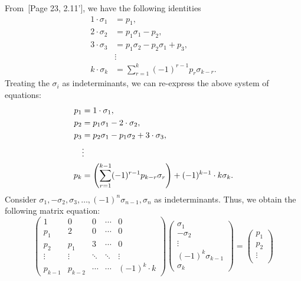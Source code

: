 \documentclass[letterpaper, 11pt, oneside]{book}
\begin{document}
\begin{sol}
  From~[Page 23, 2.11']\cite{book:MacdonaldSymmetricHall}, we have the following identities
  \begin{align*}
    1 \cdot \sigma_{1} &= p_{1}, \\
    2 \cdot \sigma_{2} &= p_{1} \sigma_{1} - p_{2}, \\
    3 \cdot \sigma_{3} &= p_{1} \sigma_{2} - p_{2} \sigma_{1} + p_{3}, \\
                       &\vdots \\
    k \cdot \sigma_{k} &= \sum_{r = 1}^{k} (-1)^{r - 1} p_{r} \sigma_{k - r}.
  \end{align*}
Treating the $\sigma_{i}$ as indeterminants, we can re-express the above system of equations:
\begin{align*}
  p_{1} &= 1 \cdot \sigma_{1}, \\
  p_{2} &= p_{1} \sigma_{1} - 2 \cdot \sigma_{2}, \\
  p_{3} &= p_{2} \sigma_{1} - p_{1} \sigma_{2} + 3 \cdot \sigma_{3}, \\
        &\vdots \\
  p_{k} &= \pqty{\sum_{r = 1}^{k - 1} (-1)^{r - 1} p_{k - r} \sigma_{r}} + (-1)^{k - 1} \cdot k \sigma_{k}.
\end{align*}
Consider $\sigma_{1}, -\sigma_{2}, \sigma_{3}, \ldots, (-1)^{n} \sigma_{n - 1}, \sigma_{n}$ as indeterminants.
Thus, we obtain the following matrix equation:
\[
  \begin{pmatrix}
    1 & 0 & 0 & \cdots & 0 \\
    p_{1} & 2 & 0 & \cdots & 0 \\
    p_{2} & p_{1} & 3 & \cdots & 0 \\
    \vdots & \vdots & \ddots & \ddots & \vdots \\
    p_{k - 1} & p_{k - 2} & \cdots & \cdots & (-1)^{k} \cdot k
  \end{pmatrix}
  \begin{pmatrix}
    \sigma_{1} \\
    -\sigma_{2} \\
    \vdots \\
    (-1)^{k} \sigma_{k - 1} \\
    \sigma_{k}
  \end{pmatrix}
  =
  \begin{pmatrix}
    p_{1} \\
    p_{2} \\
    \vdots \\

\end{pmatrix}\]
\end{sol}
\end{document}
